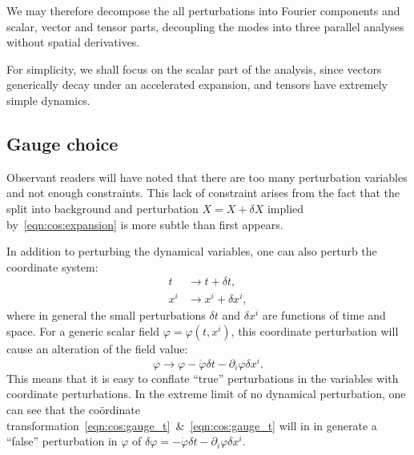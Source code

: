 We may therefore decompose the all perturbations into Fourier components and scalar, vector and tensor parts, decoupling the modes into three parallel analyses without spatial derivatives.

For simplicity, we shall focus on the scalar part of the analysis, since vectors generically decay under an accelerated expansion, and tensors have extremely simple dynamics.

\subsection{Gauge choice}
Observant readers will have noted that there are too many perturbation variables and not enough constraints.
This lack of constraint arises from the fact that the split into background and perturbation $X=X+\delta X$ implied by~\eqref{eqn:cos:expansion} is more subtle than first appears. 

In addition to perturbing the dynamical variables, one can also perturb the coordinate system:
\begin{align}
  t &\rightarrow t + \delta t,
  \label{eqn:cos:gauge_t}
  \\
  x^i &\rightarrow x^i  + \delta x^i,
  \label{eqn:cos:gauge_x}
\end{align}
where in general the small perturbations $\delta t$ and $\delta x^i$ are functions of time and space.
For a generic scalar field $\varphi = \varphi(t,x^i)$, this coordinate perturbation will cause an alteration of the field value:
\begin{equation}
  \varphi \rightarrow \varphi - \dot{\varphi}\delta t - \partial_i\varphi\delta x^i.
\end{equation}
This means that it is easy to conflate ``true'' perturbations in the variables with coordinate perturbations. In the extreme limit of no dynamical perturbation, one can see that the co\"{o}rdinate transformation~\eqref{eqn:cos:gauge_t}~\&~\eqref{eqn:cos:gauge_t} will in in generate a ``false'' perturbation in $\varphi$ of $\delta\varphi = -\dot{\varphi}\delta t - \partial_i\varphi\delta x^i$.

